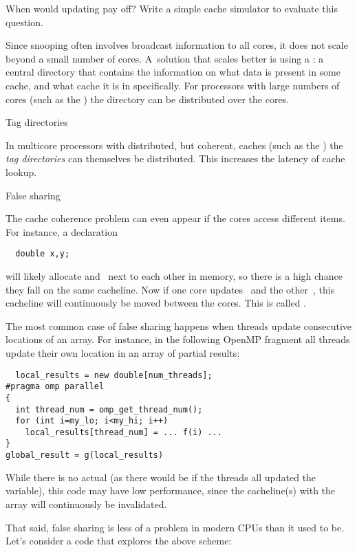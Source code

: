\begin{exercise}
  When would updating pay off? Write a simple cache simulator to evaluate this question.
\end{exercise}

Since snooping often involves broadcast information to all cores, it
does not scale beyond a small number of cores. A~solution that scales
better is using a : a central directory
that contains the information on what data is present in some cache,
and what cache it is in specifically. For processors with large
numbers of cores (such as the ) the
directory can be distributed over the cores.

 {Tag directories}

In multicore processors with distributed, but coherent, caches
(such as the )
the
%
\emph{tag directories}
can themselves be distributed. This increases the latency of cache lookup.

 {False sharing}
\label{sec:falseshare}

The cache coherence problem can even appear if the cores access
different items. For instance, a declaration
\begin{lstlisting}
  double x,y;
\end{lstlisting}
will likely allocate  and~ next to each other in memory, so
there is a high chance they fall on the same cacheline. Now if one
core updates~ and the other~, this cacheline will
continuously be moved between the cores. This is called
.

The most common case of false sharing happens when
threads update consecutive locations of an array. For instance, in the
following OpenMP fragment all threads update their own location in an
array of partial results:
\begin{lstlisting}
  local_results = new double[num_threads];
#pragma omp parallel
{
  int thread_num = omp_get_thread_num();
  for (int i=my_lo; i<my_hi; i++)
    local_results[thread_num] = ... f(i) ...
}
global_result = g(local_results)
\end{lstlisting}
While there is no actual  (as there would be
if the threads all updated the  variable),
this code may have low performance, since the cacheline(s) with the
 array will continuously be invalidated.

That said, false sharing is less of a problem in modern CPUs
than it used to be. Let's consider a code that explores the above scheme:
%

